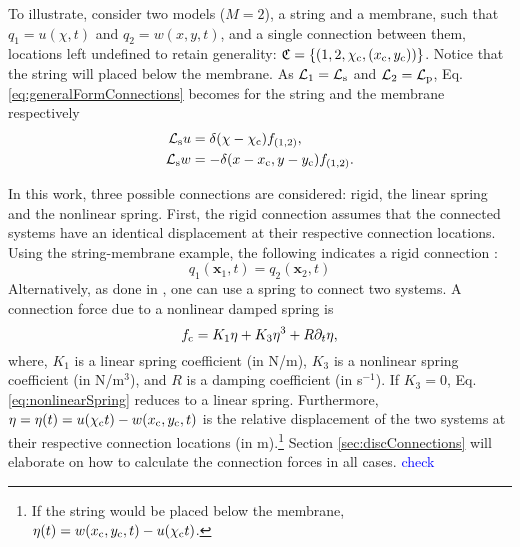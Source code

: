 \documentclass{article}
\def\SWcomment[#1]{\textcolor{blue}{#1}}
\begin{document}
To illustrate, consider two models ($M=2$), a string and a membrane, such that $q_1 = u(\chi ,t)$ and $q_2 = w(x,y,t)$, and a single connection between them, locations left undefined to retain generality: $\mathfrak{C} = \{(1, 2, \chi_\text{c}, (x_{\text{c}}, y_{\text{c}}))\}$. Notice that the string will placed below the membrane. As $\mathcal{L}_1=\mathcal{L}_{\text{s}}$ and $\mathcal{L}_2=\mathcal{L}_{\text{p}}$, Eq. \eqref{eq:generalFormConnections} becomes for the string and the membrane respectively
\begin{equation}\label{eq:contStringMembraneConn}
    \begin{aligned}
        \mathcal{L}_{\text{s}} u &= \delta(\chi - \chi_{\text{c}})f_{(1,2)},\\
        \mathcal{L}_{\text{s}} w &= -\delta(x - x_{\text{c}}, y-y_{\text{c}})f_{(1,2)}.
    \end{aligned}
\end{equation}

In this work, three possible connections are considered: rigid, the linear spring and the nonlinear spring. First, the rigid connection assumes that the connected systems have an identical displacement at their respective connection locations. Using the string-membrane example, the following indicates a rigid connection \cite{theBible}: 
\begin{equation}
    q_1(\boldsymbol{x}_1, t) = q_2(\boldsymbol{x}_2, t)
\end{equation}
Alternatively, as done in \cite{theBible, Bilbao2009Modular}, one can use a spring to connect two systems. A connection force due to a nonlinear damped spring is
\begin{equation}\label{eq:nonlinearSpring}
    f_{\text{c}} = K_1\eta + K_3\eta^3 + R\partial_t \eta,
\end{equation}
where, $K_1$ is a linear spring coefficient (in N/m), $K_3$ is a nonlinear spring coefficient (in N/m$^3$), and $R$ is a damping coefficient (in s$^{-1}$). If $K_3 = 0$, Eq. \eqref{eq:nonlinearSpring} reduces to a linear spring. Furthermore, $\eta = \eta(t) = u(\chi_{\text{c}} t) - w(x_{\text{c}}, y_{\text{c}}, t)$ is the relative displacement of the two systems at their respective connection locations (in m).\footnote{If the string would be placed below the membrane, $\eta(t) = w(x_{\text{c}}, y_{\text{c}}, t) - u(\chi_{\text{c}} t)$.} Section \ref{sec:discConnections} will elaborate on how to calculate the connection forces in all cases. \SWcomment[check]
\end{document}
